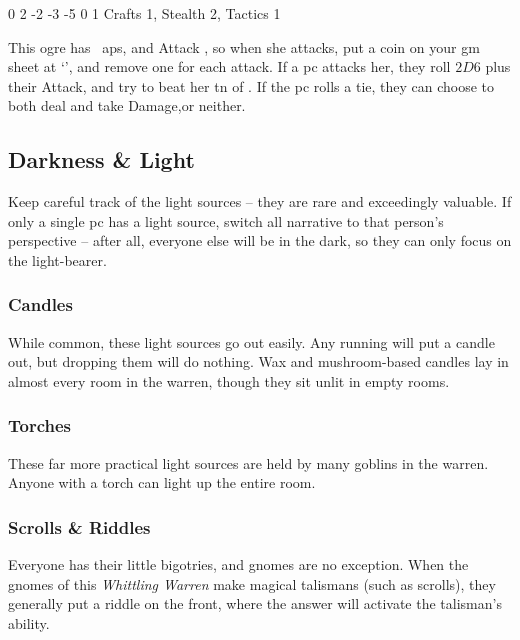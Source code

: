 \begin{multicols}{2}
{  
  {0}%
  {2}%
  {{-2}%
  {-3}%
  {-5}}%
  {0}%
  {1}%
  {Crafts 1, Stealth 2, Tactics 1}%
  {\Dagger}%
  {}

  This ogre has ~\glspl{ap}, and Attack , so when she attacks, put a coin on your \gls{gm} sheet at `', and remove one for each attack.
  If a \gls{pc} attacks her, they roll $2D6$ plus their Attack, and try to beat her \gls{tn} of .
  If the \gls{pc} rolls a tie, they can choose to both deal and take Damage,or neither.

}{}

\subsection{Darkness \& Light}

Keep careful track of the light sources -- they are rare and exceedingly valuable.
If only a single \gls{pc} has a light source, switch all narrative to that person's perspective -- after all, everyone else will be in the dark, so they can only focus on the light-bearer.

\subsubsection{Candles}

While common, these light sources go out easily.
Any running will put a candle out, but dropping them will do nothing.
Wax and mushroom-based candles lay in almost every room in the warren, though they sit unlit in empty rooms.

\subsubsection{Torches}

These far more practical light sources are held by many goblins in the warren.
Anyone with a torch can light up the entire room.

\subsubsection{Scrolls \& Riddles}
\label{scrollRiddles}

Everyone has their little bigotries, and gnomes are no exception.
When the gnomes of this \textit{Whittling Warren} make magical talismans (such as scrolls), they generally put a riddle on the front, where the answer will activate the talisman's ability.


\end{multicols}
